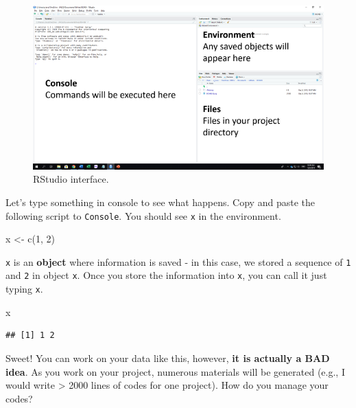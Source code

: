 \documentclass[
]{book}
\newenvironment{Shaded}{\begin{snugshade}}{\end{snugshade}}
\newcommand{\DecValTok}[1]{\textcolor[rgb]{0.00,0.00,0.81}{#1}}
\newcommand{\FunctionTok}[1]{\textcolor[rgb]{0.00,0.00,0.00}{#1}}
\newcommand{\NormalTok}[1]{#1}
\newcommand{\OtherTok}[1]{\textcolor[rgb]{0.56,0.35,0.01}{#1}}
\begin{document}
\begin{figure}

{\centering \includegraphics[width=9.47in]{image/r_image01} 

}

\caption{RStudio interface.}\label{fig:ui}
\end{figure}

Let's type something in console to see what happens. Copy and paste the following script to \texttt{Console}. You should see \texttt{x} in the environment.

\begin{Shaded}
\begin{Highlighting}[]
\NormalTok{x }\OtherTok{\textless{}{-}} \FunctionTok{c}\NormalTok{(}\DecValTok{1}\NormalTok{, }\DecValTok{2}\NormalTok{)}
\end{Highlighting}
\end{Shaded}

\texttt{x} is an \textbf{object} where information is saved - in this case, we stored a sequence of \texttt{1} and \texttt{2} in object \texttt{x}. Once you store the information into \texttt{x}, you can call it just typing \texttt{x}.

\begin{Shaded}
\begin{Highlighting}[]
\NormalTok{x}
\end{Highlighting}
\end{Shaded}

\begin{verbatim}
## [1] 1 2
\end{verbatim}

Sweet! You can work on your data like this, however, \textbf{it is actually a BAD idea}. As you work on your project, numerous materials will be generated (e.g., I would write \textgreater{} 2000 lines of codes for one project). How do you manage your codes?
\end{document}
